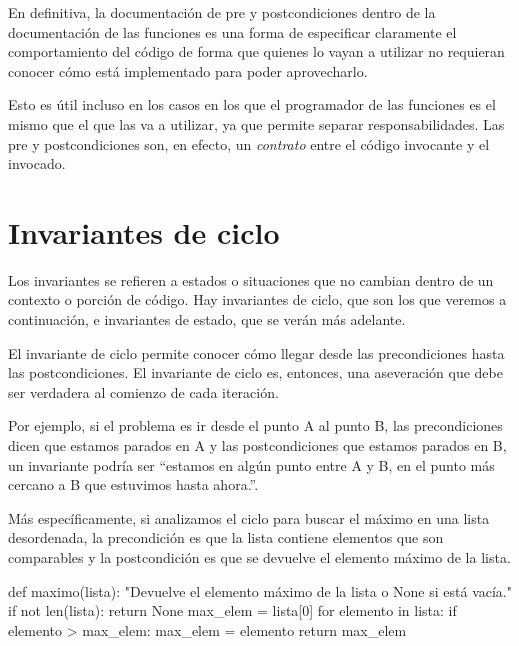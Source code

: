 En definitiva, la documentación de pre y postcondiciones dentro de la documentación
de las funciones es una forma de especificar claramente el comportamiento del
código de forma que quienes lo vayan a utilizar no requieran conocer cómo está
implementado para poder aprovecharlo.

Esto es útil incluso en los casos en los que el programador de las funciones
es el mismo que el que las va a utilizar, ya que permite separar
responsabilidades. Las pre y postcondiciones son, en efecto, un
\textit{contrato} entre el código invocante y el invocado.

\section{Invariantes de ciclo}


Los invariantes se refieren a estados o situaciones que no cambian dentro
de un contexto o porción de código.  Hay invariantes de ciclo, que son los
que veremos a continuación, e invariantes de estado, que se verán más
adelante.

El invariante de ciclo permite conocer cómo llegar desde las precondiciones
hasta las postcondiciones. El invariante de ciclo es, entonces, una
aseveración que debe ser verdadera al comienzo de cada iteración.

Por ejemplo, si el problema es ir desde el punto A al punto B, las
precondiciones dicen que estamos parados en A y las postcondiciones que
estamos parados en B, un invariante podría ser ``estamos en algún punto entre
A y B, en el punto más cercano a B que estuvimos hasta ahora.''.

Más específicamente, si analizamos el ciclo para buscar el máximo en una lista
desordenada, la precondición es que la lista contiene elementos que son
comparables y la postcondición es que se devuelve el elemento máximo de la
lista.

\begin{codigo-python}
def maximo(lista):
    "Devuelve el elemento máximo de la lista o None si está vacía."
    if not len(lista):
        return None
    max_elem = lista[0]
    for elemento in lista:
        if elemento > max_elem:
            max_elem = elemento
    return max_elem
\end{codigo-python}

